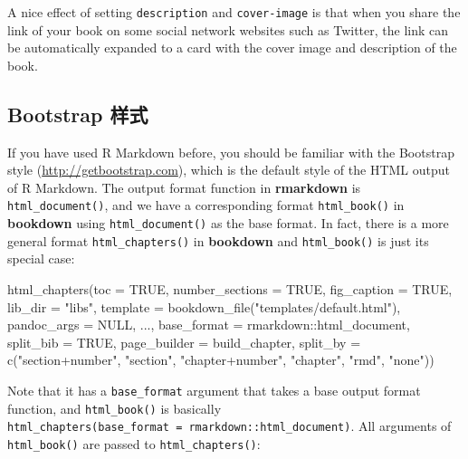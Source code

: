 \documentclass[
  12pt,
]{krantz}
\newenvironment{Shaded}{\begin{snugshade}}{\end{snugshade}}
\newcommand{\AttributeTok}[1]{\textcolor[rgb]{0.77,0.63,0.00}{#1}}
\newcommand{\ConstantTok}[1]{\textcolor[rgb]{0.00,0.00,0.00}{#1}}
\newcommand{\FunctionTok}[1]{\textcolor[rgb]{0.00,0.00,0.00}{#1}}
\newcommand{\NormalTok}[1]{#1}
\newcommand{\SpecialCharTok}[1]{\textcolor[rgb]{0.00,0.00,0.00}{#1}}
\newcommand{\StringTok}[1]{\textcolor[rgb]{0.31,0.60,0.02}{#1}}
\theoremstyle{definition}
\theoremstyle{definition}
\theoremstyle{definition}
\theoremstyle{definition}
\theoremstyle{remark}
\begin{document}
A nice effect of setting \texttt{description} and \texttt{cover-image} is that when you share the link of your book on some social network websites such as Twitter, the link can be automatically expanded to a card with the cover image and description of the book.

\hypertarget{bootstrap-ux6837ux5f0f}{%
\subsection{Bootstrap 样式}\label{bootstrap-ux6837ux5f0f}}

If you have used R Markdown before, you should be familiar with the Bootstrap style (\url{http://getbootstrap.com}), which is the default style of the HTML output of R Markdown. The output format function in \textbf{rmarkdown} is \texttt{html\_document()}, and we have a corresponding format \texttt{html\_book()} in \textbf{bookdown} using \texttt{html\_document()} as the base format. In fact, there is a more general format \texttt{html\_chapters()} in \textbf{bookdown} and \texttt{html\_book()} is just its special case:

\begin{Shaded}
\begin{Highlighting}[]
\FunctionTok{html\_chapters}\NormalTok{(}\AttributeTok{toc =} \ConstantTok{TRUE}\NormalTok{, }\AttributeTok{number\_sections =} \ConstantTok{TRUE}\NormalTok{,}
  \AttributeTok{fig\_caption =} \ConstantTok{TRUE}\NormalTok{, }\AttributeTok{lib\_dir =} \StringTok{"libs"}\NormalTok{,}
  \AttributeTok{template =} \FunctionTok{bookdown\_file}\NormalTok{(}\StringTok{"templates/default.html"}\NormalTok{),}
  \AttributeTok{pandoc\_args =} \ConstantTok{NULL}\NormalTok{, ...,}
  \AttributeTok{base\_format =}\NormalTok{ rmarkdown}\SpecialCharTok{::}\NormalTok{html\_document,}
  \AttributeTok{split\_bib =} \ConstantTok{TRUE}\NormalTok{, }\AttributeTok{page\_builder =}\NormalTok{ build\_chapter,}
  \AttributeTok{split\_by =} \FunctionTok{c}\NormalTok{(}\StringTok{"section+number"}\NormalTok{, }\StringTok{"section"}\NormalTok{, }\StringTok{"chapter+number"}\NormalTok{, }\StringTok{"chapter"}\NormalTok{, }\StringTok{"rmd"}\NormalTok{, }\StringTok{"none"}\NormalTok{))}
\end{Highlighting}
\end{Shaded}

Note that it has a \texttt{base\_format} argument that takes a base output format function, and \texttt{html\_book()} is basically \texttt{html\_chapters(base\_format\ =\ rmarkdown::html\_document)}. All arguments of \texttt{html\_book()} are passed to \texttt{html\_chapters()}:
\end{document}
